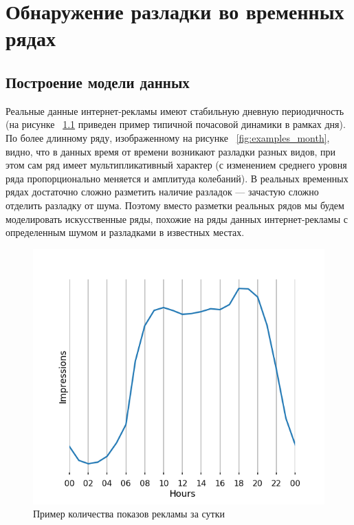 \documentclass[%
12pt,
master,  %
natbib,      %
subf,        %
substylefile = spbu.rtx,
href,        %
colorlinks,  %
]{disser}
\begin{document}
\chapter{Обнаружение разладки во временных рядах}

\section{Построение модели данных}\label{section:data_modeling}

Реальные данные интернет-рекламы имеют стабильную дневную периодичность (на рисунке ~\ref{fig:examples_day} приведен пример типичной почасовой динамики в рамках дня). По более длинному ряду, изображенному на рисунке ~\ref{fig:examples_month}, видно, что в данных время от времени возникают разладки разных видов, при этом сам ряд имеет мультипликативный характер (с изменением среднего уровня ряда пропорционально меняется и амплитуда колебаний). В реальных временных рядах достаточно сложно разметить наличие разладок --- зачастую сложно отделить разладку от шума. Поэтому вместо разметки реальных рядов мы будем моделировать искусственные ряды, похожие на ряды данных интернет-рекламы с определенным шумом и разладками в известных местах.

\begin{figure}[!hhh]
	\begin{center}
		\includegraphics[width=12cm]{examples_day}
	\end{center}
	\vspace{-5mm}\caption{Пример количества показов рекламы за сутки}
	\label{fig:examples_day}
\end{figure}
 
\end{document}

